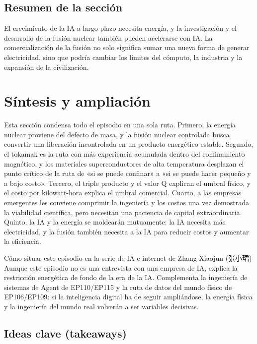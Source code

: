 \documentclass[a4paper]{article}
\begin{document}
\subsection{Resumen de la sección}

El crecimiento de la IA a largo plazo necesita energía, y la investigación y el desarrollo de la fusión nuclear también pueden acelerarse con IA. La comercialización de la fusión no solo significa sumar una nueva forma de generar electricidad, sino que podría cambiar los límites del cómputo, la industria y la expansión de la civilización.
\section{Síntesis y ampliación}

Esta sección condensa todo el episodio en una sola ruta. Primero, la energía nuclear proviene del defecto de masa, y la fusión nuclear controlada busca convertir una liberación incontrolada en un producto energético estable. Segundo, el tokamak es la ruta con más experiencia acumulada dentro del confinamiento magnético, y los materiales superconductores de alta temperatura desplazan el punto crítico de la ruta de «si se puede confinar» a «si se puede hacer pequeño y a bajo costo». Tercero, el triple producto y el valor Q explican el umbral físico, y el costo por kilowatt-hora explica el umbral comercial. Cuarto, a las empresas emergentes les conviene comprimir la ingeniería y los costos una vez demostrada la viabilidad científica, pero necesitan una paciencia de capital extraordinaria. Quinto, la IA y la energía se moldearán mutuamente: la IA necesita más electricidad, y la fusión también necesita a la IA para reducir costos y aumentar la eficiencia.

\begin{importantbox}{Cómo situar este episodio en la serie de IA e internet de Zhang Xiaojun (张小珺)}
Aunque este episodio no es una entrevista con una empresa de IA, explica la restricción energética de fondo de la era de la IA. Complementa la ingeniería de sistemas de Agent de EP110/EP115 y la ruta de datos del mundo físico de EP106/EP109: si la inteligencia digital ha de seguir ampliándose, la energía física y la ingeniería del mundo real volverán a ser variables decisivas.
\end{importantbox}

\subsection{Ideas clave (takeaways)}
\end{document}
